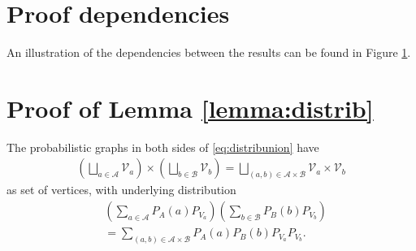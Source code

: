 \documentclass[conference,a4paper]{IEEEtran}
\begin{document}
\section{Proof dependencies}

An illustration of the dependencies between the results can be found in Figure \ref{fig:dependances}.

\begin{figure}[omitted: a diagram of this paper's results, not reproduced here]\label{fig:dependances}\end{figure}

\section{Proof of Lemma \ref{lemma:distrib}} \label{section:prooflemmadistrib}

    The probabilistic graphs in both sides of \eqref{eq:distribunion} have 
    \begin{align}
        \left(\bigsqcup_{a \in \mathcal{A}} \mathcal{V}_a\right) \times \left(\bigsqcup_{b \in \mathcal{B}} \mathcal{V}_b\right) = \bigsqcup_{(a,b) \in \mathcal{A}\times \mathcal{B}} \mathcal{V}_a \times \mathcal{V}_b
    \end{align}
    as set of vertices, with underlying distribution 
    \begin{align}
        & \left(\sum_{a \in \mathcal{A}} P_A(a) P_{V_a}\right)\left(\sum_{b \in \mathcal{B}} P_B(b) P_{V_b}\right) \nonumber\\
        & = \sum_{(a,b) \in \mathcal{A}\times \mathcal{B}} P_A(a) P_B(b) P_{V_a} P_{V_b}.
    \end{align}
    
\end{document}
